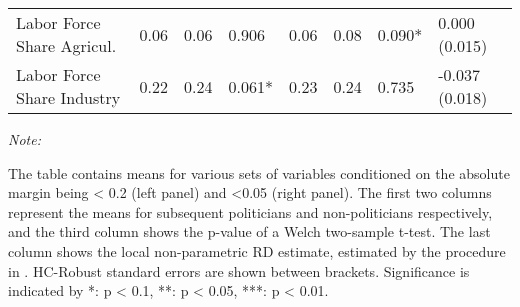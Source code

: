 \begin{table}[!h]
{\begin{threeparttable}
\begin{tabular}[t]{llllllll}
\hspace{1em}Labor Force Share Agricul. & \num{0.06} & \num{0.06} & 0.906 & \num{0.06} & \num{0.08} & 0.090* & 0.000 (0.015)\\
\hspace{1em}Labor Force Share Industry & \num{0.22} & \num{0.24} & 0.061* & \num{0.23} & \num{0.24} & 0.735 & -0.037 (0.018)\\
\bottomrule
\end{tabular}
\begin{tablenotes}[para]
\item \textit{Note: } 
\item The table contains means for various sets of variables conditioned on the absolute margin being < 0.2 (left panel) and <0.05 (right panel). The first two columns represent the means for subsequent politicians and non-politicians respectively, and the third column shows the p-value of a Welch two-sample t-test. The last column shows the local non-parametric RD estimate, estimated by the procedure in \cite{cattaneo2019practical}. HC-Robust standard errors are shown between brackets. Significance is indicated by *: p < 0.1, **: p < 0.05, ***: p < 0.01.
\end{tablenotes}
\end{threeparttable}}
\end{table}

